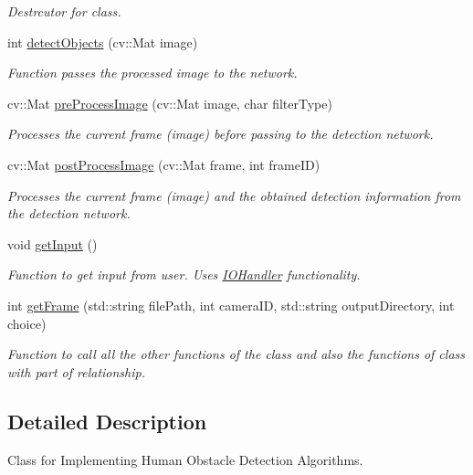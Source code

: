 \begin{DoxyCompactItemize}
\begin{DoxyCompactList}\small\item\em Destrcutor for class. \end{DoxyCompactList}\item 
int \hyperlink{classDetectionModule_a19425b06ff8ab05da7baf445da26f94a}{detect\+Objects} (cv\+::\+Mat image)
\begin{DoxyCompactList}\small\item\em Function passes the processed image to the network. \end{DoxyCompactList}\item 
cv\+::\+Mat \hyperlink{classDetectionModule_a50f820e631ffbda26d20a1b2fb6b5790}{pre\+Process\+Image} (cv\+::\+Mat image, char filter\+Type)
\begin{DoxyCompactList}\small\item\em Processes the current frame (image) before passing to the detection network. \end{DoxyCompactList}\item 
cv\+::\+Mat \hyperlink{classDetectionModule_a2f4d5396fb17a484f6f9905598070e47}{post\+Process\+Image} (cv\+::\+Mat frame, int frame\+ID)
\begin{DoxyCompactList}\small\item\em Processes the current frame (image) and the obtained detection information from the detection network. \end{DoxyCompactList}\item 
void \hyperlink{classDetectionModule_ae6cbbbc1bfd1326b8ebbd83bc9e714bf}{get\+Input} ()
\begin{DoxyCompactList}\small\item\em Function to get input from user. Uses \hyperlink{classIOHandler}{I\+O\+Handler} functionality. \end{DoxyCompactList}\item 
int \hyperlink{classDetectionModule_a8d9d9c0e5b988ce56a290fa0e1fe56ae}{get\+Frame} (std\+::string file\+Path, int camera\+ID, std\+::string output\+Directory, int choice)
\begin{DoxyCompactList}\small\item\em Function to call all the other functions of the class and also the functions of class with part of relationship. \end{DoxyCompactList}\end{DoxyCompactItemize}


\subsection{Detailed Description}
Class for Implementing Human Obstacle Detection Algorithms. 

